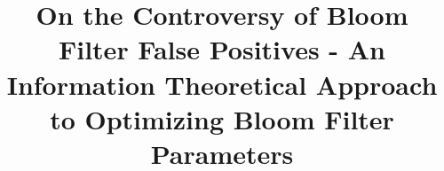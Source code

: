 \date{}

\title{\Large \bf On the Controversy of Bloom Filter False Positives - An Information Theoretical Approach to Optimizing Bloom Filter Parameters}

\begin{comment}
\author{
{\rm Your N.\ Here}\\
Your Institution
\and
{\rm Second Name}\\
Second Institution
} %

\end{comment}

\maketitle







%


%







